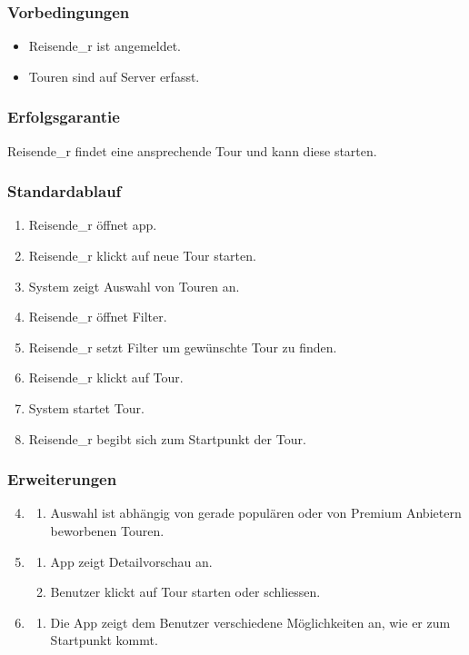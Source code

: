 \documentclass[a4paper,10pt,xetex]{article}
\begin{document}
\subsubsection{Vorbedingungen}\label{vorbedingungen}
\begin{itemize}
  \item Reisende\_r ist angemeldet.
  \item Touren sind auf Server erfasst.
\end{itemize}


\subsubsection{Erfolgsgarantie}\label{erfolgsgarantie}
Reisende\_r findet eine ansprechende Tour und kann diese starten.


\subsubsection{Standardablauf}\label{standardablauf}
\begin{enumerate}
  \item Reisende\_r öffnet app.
  \item Reisende\_r klickt auf neue Tour starten.
  \item System zeigt Auswahl von Touren an.
  \item Reisende\_r öffnet Filter.
  \item Reisende\_r setzt Filter um gewünschte Tour zu finden.
  \item Reisende\_r klickt auf Tour.
  \item System startet Tour.
  \item Reisende\_r begibt sich zum Startpunkt der Tour.
\end{enumerate}


\subsubsection{Erweiterungen}\label{erweiterungen}
\begin{enumerate}
  \setcounter{enumi}{3}
  \item
    \begin{enumerate}
      \item Auswahl ist abhängig von gerade populären oder von Premium Anbietern beworbenen Touren.
    \end{enumerate}

  \setcounter{enumi}{6}
  \item
    \begin{enumerate}
      \item App zeigt Detailvorschau an.
      \item Benutzer klickt auf Tour starten oder schliessen.
    \end{enumerate}

  \setcounter{enumi}{8}
  \item
    \begin{enumerate}
      \item Die App zeigt dem Benutzer verschiedene Möglichkeiten an, wie er zum Startpunkt kommt.
    \end{enumerate}
\end{enumerate}
\end{document}

